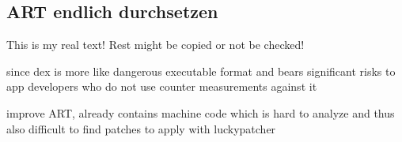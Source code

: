 \subsection{ART endlich durchsetzen} \label{subsection:counter-external-art}
This is my real text! Rest might be copied or not be checked!

since dex is more like dangerous executable format and bears significant risks to app developers who do not use counter measurements against it

improve ART, already contains machine code which is hard to analyze and thus also difficult to find patches to apply with luckypatcher
